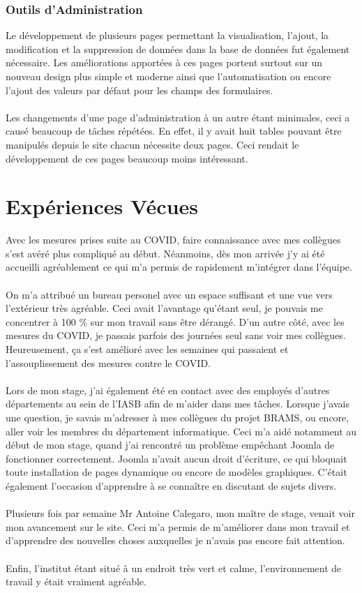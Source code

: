 \documentclass[11pt]{article}
\begin{document}
\subsubsection{Outils d'Administration}

Le développement de plusieurs pages permettant la visualisation, l'ajout, la modification et la suppression de données dans la base de données fut également nécessaire.
Les améliorations apportées à ces pages portent surtout sur un nouveau design plus simple et moderne ainsi que l'automatisation ou encore l'ajout des valeurs par défaut pour les champs des formulaires.\\
\\
Les changements d'une page d'administration à un autre étant minimales, ceci a causé beaucoup de tâches répétées.
En effet, il y avait huit tables pouvant être manipulés depuis le site chacun nécessite deux pages.
Ceci rendait le développement de ces pages beaucoup moins intéressant.

\newpage

\section{Expériences Vécues}

Avec les mesures prises suite au COVID, faire connaissance avec mes collègues s'est avéré plus compliqué au début.
Néanmoins, dès mon arrivée j'y ai été accueilli agréablement ce qui m'a permis de rapidement m'intégrer dans l'équipe.\\
\\
On m'a attribué un bureau personel avec un espace suffisant et une vue vers l'extérieur très agréable.
Ceci avait l'avantage qu'étant seul, je pouvais me concentrer à 100 \% sur mon travail sans être dérangé.
D'un autre côté, avec les mesures du COVID, je passais parfois des journées seul sans voir mes collègues.
Heureusement, ça s'est amélioré avec les semaines qui passaient et l'assouplissement des mesures contre le COVID.\\
\\
Lors de mon stage, j'ai également été en contact avec des employés d'autres départements au sein de l'IASB afin de m'aider dans mes tâches.
Lorsque j'avais une question, je savais m'adresser à mes collègues du projet BRAMS, ou encore, aller voir les membres du département informatique.
Ceci m'a aidé notamment au début de mon stage, quand j'ai rencontré un problème empêchant Joomla de fonctionner correctement.
Joomla n'avait aucun droit d'écriture, ce qui bloquait toute installation de pages dynamique ou encore de modèles graphiques.
C'était également l'occasion d'apprendre à se connaître en discutant de sujets divers.\\
\\
Plusieurs fois par semaine Mr Antoine Calegaro, mon maître de stage, venait voir mon avancement sur le site.
Ceci m'a permis de m'améliorer dans mon travail et d'apprendre des nouvelles choses auxquelles je n'avais pas encore fait attention.\\
\\
Enfin, l'institut étant situé à un endroit très vert et calme, l'environnement de travail y était vraiment agréable.
\end{document}
